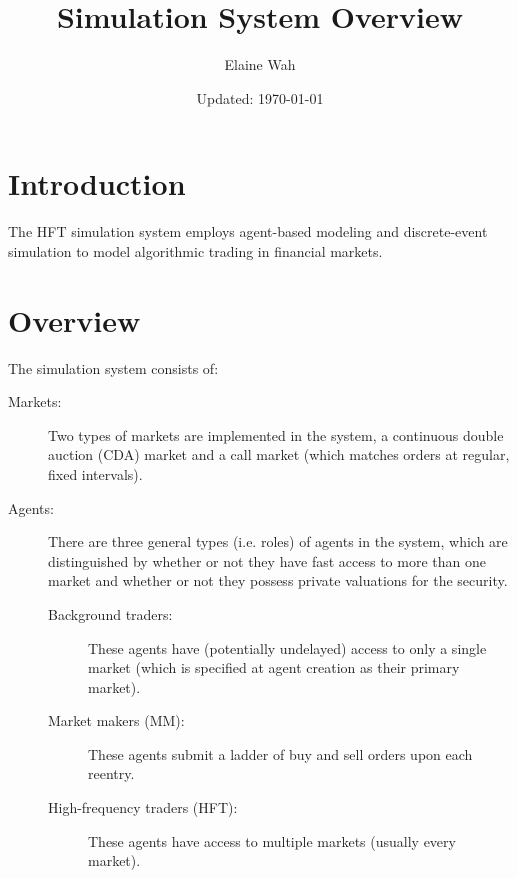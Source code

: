 \documentclass[11pt]{article}
\title{Simulation System Overview}
\author{
  Elaine Wah \\
  \email{ewah@umich.edu}
}
\date{Updated: \today}
\begin{document}
\maketitle

\section{Introduction}

The HFT simulation system employs agent-based modeling and discrete-event simulation to model algorithmic trading in financial markets.

\section{Overview}

The simulation system consists of:
\begin{description}
\item[Markets:] Two types of markets are implemented in the system, a
  continuous double auction (CDA) market and a call market (which matches orders at regular, fixed
  intervals).

\item[Agents:] There are three general types (i.e. roles) of agents in the system,
  which are distinguished by whether or not they have fast access to more than
  one market and whether or not they possess private valuations for the security.

\begin{description}
\item[Background traders:] These agents have (potentially
  undelayed) access to only a single market (which is specified at agent creation as their primary market). 

\item[Market makers (MM):] These agents submit a ladder of buy and sell orders upon each reentry. 

\item[High-frequency traders (HFT):] These agents have access to
  multiple markets (usually every market). 
\end{description}
\end{description}
\end{document}
